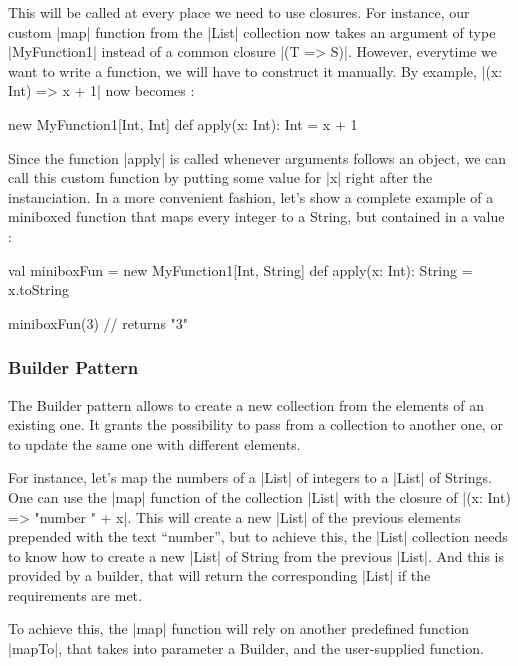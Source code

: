 This will be called at every place we need to use closures. For instance, our custom |map| function from the |List| collection now takes an argument of type |MyFunction1| instead of a common closure |(T => S)|. However, everytime we want to write a function, we will have to construct it manually. By example, |(x: Int) => x + 1| now becomes :

\begin{lstlisting-nobreak}
 new MyFunction1[Int, Int] {
   def apply(x: Int): Int = x + 1
 }
\end{lstlisting-nobreak}

Since the function |apply| is called whenever arguments follows an object, we can call this custom function by putting some value for |x| right after the instanciation. In a more convenient fashion, let's show a complete example of a miniboxed function that maps every integer to a String, but contained in a value :

\begin{lstlisting-nobreak}
 val miniboxFun = new MyFunction1[Int, String] {
   def apply(x: Int): String = x.toString
 }
 
 miniboxFun(3)    // returns "3"
\end{lstlisting-nobreak}

\subsubsection{Builder Pattern}

The Builder pattern allows to create a new collection from the elements of an existing one. It grants the possibility to pass from a collection to another one, or to update the same one with different elements.


For instance, let's map the numbers of a |List| of integers to a |List| of Strings. One can use the |map| function of the collection |List| with the closure of |(x: Int) => "number " + x|. This will create a new |List| of the previous elements prepended with the text ``number'', but to achieve this, the |List| collection needs to know how to create a new |List| of String from the previous |List|. And this is provided by a builder, that will return the corresponding |List| if the requirements are met.

To achieve this, the |map| function will rely on another predefined function |mapTo|, that takes into parameter a Builder, and the user-supplied function.


